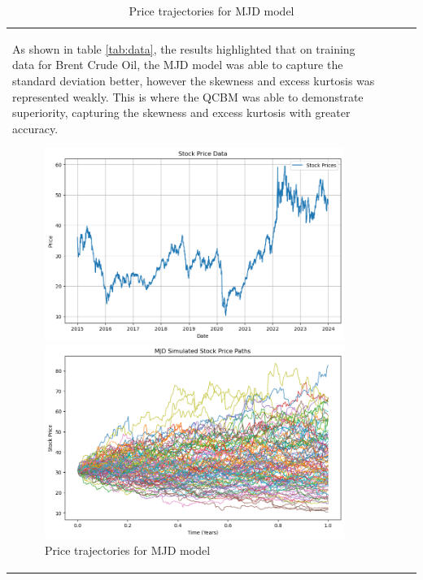\documentclass[12pt]{article}
\numberwithin{equation}{section}
\begin{document}
\begin{table}[h!]
\begin{tabular}{|l|c|c|c|}
As shown in table \ref{tab:data}, the results highlighted that on training data 
for Brent Crude Oil, the 
MJD model was able to capture the standard deviation better, however the skewness 
and excess kurtosis was represented weakly. This is where the QCBM was able to 
demonstrate superiority, 
capturing the skewness and excess kurtosis with greater accuracy. 
\begin{figure}[h!]
    \centering
    \begin{minipage}{0.48\textwidth}
        \centering
        \includegraphics[width=\linewidth]{realpricepath.png}
        \caption{True price path}
        \label{fig:realpricepath}
    \end{minipage}
    \hfill
    \begin{minipage}{0.48\textwidth}
        \centering
        \includegraphics[width=\linewidth]{mjdpricepath.png}
        \caption{Price trajectories for MJD model}
        \label{fig:mjdpricepath}

\end{minipage}
\end{figure}
\end{tabular}
\end{table}
\end{document}
